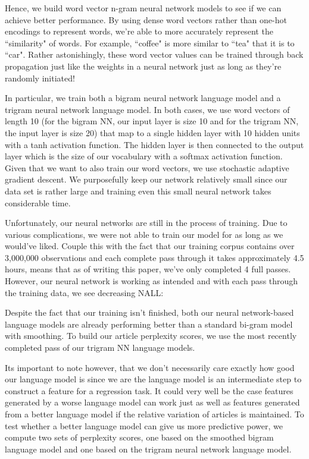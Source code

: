 \documentclass[fleqn,12pt]{SelfArx} %
\begin{document}
Hence, we build word vector n-gram neural network models to see if we can achieve better performance. By using dense word vectors rather than one-hot encodings to represent words, we're able to more accurately represent the ``similarity" of words. For example, ``coffee" is more similar to ``tea" that it is to ``car". Rather astonishingly, these word vector values can be trained through back propagation just like the weights in a neural network just as long as they're randomly initiated! 

 In particular, we train both a bigram neural network language model and a trigram neural network language model. In both cases, we use word vectors of length 10 (for the bigram NN, our input layer is size 10 and for the trigram NN, the input layer is size 20) that map to a single hidden layer with 10 hidden units with a tanh activation function. The hidden layer is then connected to the output layer which is the size of our vocabulary with a softmax activation function. Given that we want to also train our word vectors, we use stochastic adaptive gradient descent. We purposefully keep our network relatively small since our data set is rather large and training even this small neural network takes considerable time. 
 
 Unfortunately, our neural networks are still in the process of training. Due to various complications, we were not able to train our model for as long as we would've liked. Couple this with the fact that our training corpus contains over 3,000,000 observations and each complete pass through it takes approximately 4.5 hours, means that as of writing this paper, we've only completed 4 full passes. However, our neural network is working as intended and with each pass through the training data, we see decreasing NALL:
 
 
Despite the fact that our training isn't finished, both our neural network-based language models are already performing better than a standard bi-gram model with smoothing. To build our article perplexity scores, we use the most recently completed pass of our trigram NN language models.

Its important to note however, that we don't necessarily care exactly how good our language model is since we are the language model is an intermediate step to construct a feature for a regression task. It could very well be the case features generated by a worse language model can work just as well as features generated from a better language model if the relative variation of articles is maintained. To test whether a better language model can give us more predictive power, we compute two sets of perplexity scores, one based on the smoothed bigram language model and one based on the trigram neural network language model. 
\end{document}
